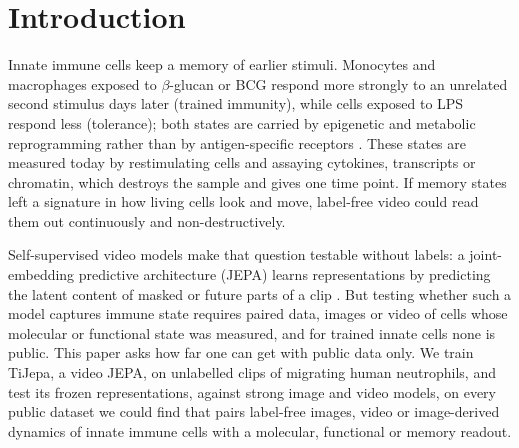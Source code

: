 \section{Introduction}
\label{sec:intro}
Innate immune cells keep a memory of earlier stimuli. Monocytes and macrophages exposed to
$\beta$-glucan or BCG respond more strongly to an unrelated second stimulus days later
(trained immunity), while cells exposed to LPS respond less (tolerance); both states are
carried by epigenetic and metabolic reprogramming rather than by antigen-specific receptors
\citep{netea2016,saeed2014,novakovic2016}. These states are measured today by restimulating
cells and assaying cytokines, transcripts or chromatin, which destroys the sample and gives
one time point. If memory states left a signature in how living cells look and move, label-free
video could read them out continuously and non-destructively.

Self-supervised video models make that question testable without labels: a joint-embedding
predictive architecture (JEPA) learns representations by predicting the latent content of
masked or future parts of a clip \citep{vjepa,vjepa2}. But testing whether such a model
captures immune state requires paired data, images or video of cells whose molecular or
functional state was measured, and for trained innate cells none is public. This paper asks
how far one can get with public data only. We train TiJepa, a video JEPA, on
 unlabelled clips of migrating human neutrophils, and test its frozen
representations, against strong image and video models, on every public dataset we could
find that pairs label-free images, video or image-derived dynamics of innate immune cells with a
molecular, functional or memory readout.

